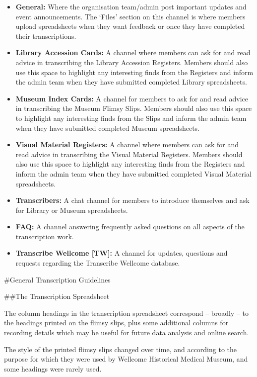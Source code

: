 \documentclass[
  openany]{book}
\begin{document}
\begin{itemize}
\item
  \textbf{General:} Where the organisation team/admin post important updates and event announcements. The `Files' section on this channel is where members upload spreadsheets when they want feedback or once they have completed their transcriptions.
\item
  \textbf{Library Accession Cards:} A channel where members can ask for and read advice in transcribing the Library Accession Registers. Members should also use this space to highlight any interesting finds from the Registers and inform the admin team when they have submitted completed Library spreadsheets.
\item
  \textbf{Museum Index Cards:} A channel for members to ask for and read advice in transcribing the Museum Flimsy Slips. Members should also use this space to highlight any interesting finds from the Slips and inform the admin team when they have submitted completed Museum spreadsheets.
\item
  \textbf{Visual Material Registers:} A channel where members can ask for and read advice in transcribing the Visual Material Registers. Members should also use this space to highlight any interesting finds from the Registers and inform the admin team when they have submitted completed Visual Material spreadsheets.
\item
  \textbf{Transcribers:} A chat channel for members to introduce themselves and ask for Library or Museum spreadsheets.
\item
  \textbf{FAQ:} A channel answering frequently asked questions on all aspects of the transcription work.
\item
  \textbf{Transcribe Wellcome {[}TW{]}:} A channel for updates, questions and requests regarding the Transcribe Wellcome database.
\end{itemize}

\#General Transcription Guidelines

\#\#The Transcription Spreadsheet

The column headings in the transcription spreadsheet correspond -- broadly -- to the headings printed on the flimsy slips, plus some additional columns for recording details which may be useful for future data analysis and online search.

The style of the printed flimsy slips changed over time, and according to the purpose for which they were used by Wellcome Historical Medical Museum, and some headings were rarely used.
\end{document}

